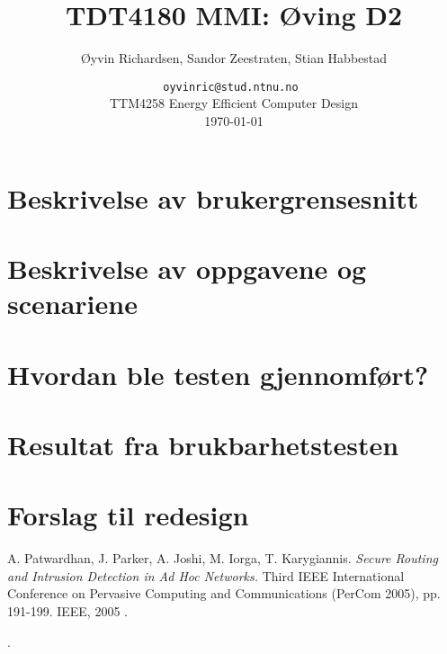 \documentclass[a4paper,11pt]{article}
\title{TDT4180 MMI: Øving D2}
\author{\O yvin Richardsen, Sandor Zeestraten, Stian Habbestad}
\date{ {\tt oyvinric@stud.ntnu.no }\\
TTM4258 Energy Efficient Computer Design \\
\today}
\begin{document}
\maketitle
\newpage

\begin{abstract}

\end{abstract}

\tableofcontents

\section{Beskrivelse av brukergrensesnitt}


\section{Beskrivelse av oppgavene og scenariene}


\section{Hvordan ble testen gjennomført?}


\section{Resultat fra brukbarhetstesten}


\section{Forslag til redesign}



\footnotesize{  %
\begin{thebibliography}{N}

 A. Patwardhan, J. Parker, A. Joshi, M. Iorga, T. Karygiannis.
\textit{Secure Routing and Intrusion Detection in Ad Hoc Networks.}
Third IEEE International Conference on Pervasive Computing and Communications (PerCom 2005), pp. 191-199. IEEE, 2005 .


\end{thebibliography}.  
}
\end{document}

